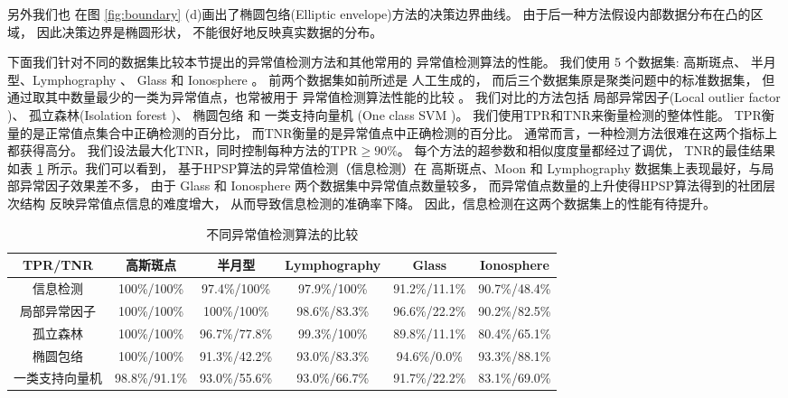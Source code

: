 另外我们也
在图 \ref{fig:boundary} (d)画出了椭圆包络\cite{rousseeuw1999fast}(Elliptic envelope)方法的决策边界曲线。
由于后一种方法假设内部数据分布在凸的区域，
因此决策边界是椭圆形状，
不能很好地反映真实数据的分布。

下面我们针对不同的数据集比较本节提出的异常值检测方法和其他常用的
异常值检测算法的性能。
我们使用 5 个数据集: 高斯斑点、 半月型、Lymphography
\cite{lazarevic2005feature}、 Glass 和 Ionosphere \cite{keller2012hics}。 
前两个数据集如前所述是
人工生成的，
而后三个数据集原是聚类问题中的标准数据集，
但通过取其中数量最少的一类为异常值点，也常被用于%
异常值检测算法性能的比较
\cite{campos2016evaluation}。
我们对比的方法包括
局部异常因子(Local outlier factor \citep{Breunig})、
孤立森林(Isolation forest \citep{if})、
椭圆包络  和
一类支持向量机 (One class SVM \citep{svm})。 
我们使用TPR和TNR来衡量检测的整体性能。
TPR衡量的是正常值点集合中正确检测的百分比，
而TNR衡量的是异常值点中正确检测的百分比。
通常而言，一种检测方法很难在这两个指标上都获得高分。
我们设法最大化TNR，同时控制每种方法的TPR$\geq 90\%$。
每个方法的超参数和相似度度量都经过了调优，
TNR的最佳结果如表 \ref{tab:odm} 所示。我们可以看到，
基于HPSP算法的异常值检测（信息检测）在 高斯斑点、Moon 和
Lymphography 数据集上表现最好，与局部异常因子效果差不多，
由于 Glass 和 Ionosphere 两个数据集中异常值点数量较多，
而异常值点数量的上升使得HPSP算法得到的社团层次结构
反映异常值点信息的难度增大，
从而导致信息检测的准确率下降。
因此，信息检测在这两个数据集上的性能有待提升。
\begin{table}
  \begin{adjustbox}{width=\columnwidth,center}
\begin{tabular}{cccccc}
  \hline
         TPR/TNR        &  高斯斑点   &      半月型       &  Lymphography  &     Glass     &  Ionosphere   \\
  \hline
      信息检测    & 100\%/100\% & 97.4\%/100\%  & 97.9\%/100\% & 91.2\%/11.1\% & 90.7\%/48.4\% \\
      局部异常因子 & 100\%/100\% & 100\%/100\% & 98.6\%/83.3\%  & 96.6\%/22.2\% & 90.2\%/82.5\% \\
   孤立森林   & 100\%/100\% &  96.7\%/77.8\%  & 99.3\%/100\% & 89.8\%/11.1\% & 80.4\%/65.1\% \\
    椭圆包络   & 100\%/100\% &  91.3\%/42.2\%  & 93.0\%/83.3\%  & 94.6\%/0.0\%  & 93.3\%/88.1\% \\
     一类支持向量机     &  98.8\%/91.1\%  &  93.0\%/55.6\%  & 93.0\%/66.7\%  & 91.7\%/22.2\% & 83.1\%/69.0\% \\
  \hline
  \end{tabular}
\end{adjustbox}
\caption{不同异常值检测算法的比较}\label{tab:odm}
\end{table}

